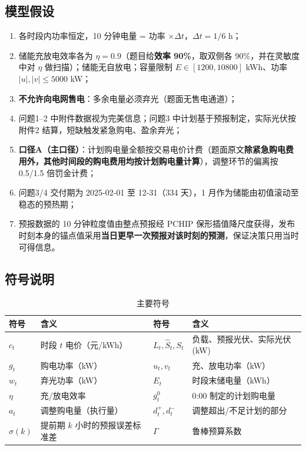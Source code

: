 \documentclass[11pt,a4paper]{ctexart}
\begin{document}
\subsection{模型假设}
\begin{enumerate}[label=\textbf{A\arabic*.}]
  \item 各时段内功率恒定，10 分钟电量 = 功率 $\times\Delta t$，$\Delta t=1/6$ h；
  \item 储能充放电效率各为 $\eta=0.9$（题目给\textbf{效率 90\%}，取双侧各 90\%，并在灵敏度中对 $\eta$ 做扫描）；储能无自放电；容量限制 $E\in[1200,10800]$ kWh、功率 $|u|,|v|\le 5000$ kW；
  \item \textbf{不允许向电网售电}：多余电量必须弃光（题面无售电通道）；
  \item 问题1--2 中附件数据视为完美信息；问题3 中计划基于预报制定，实际光伏按附件2 结算，短缺触发紧急购电、盈余弃光；
  \item \textbf{口径A（主口径）}：计划购电量全额按交易电价计费（题面原文\textbf{除紧急购电费用外，其他时间段的购电费用均按计划购电量计算}），调整环节的偏离按 0.5/1.5 倍罚金计费；
  \item 问题3/4 交付期为 2025-02-01 至 12-31（334 天），1 月作为储能由初值滚动至稳态的预热期；
  \item 预报数据的 10 分钟粒度值由整点预报经 PCHIP 保形插值降尺度获得，发布时刻本身的锚点值采用\textbf{当日更早一次预报对该时刻的预测}，保证决策只用当时可得信息。
\end{enumerate}

\subsection{符号说明}
\begin{table}[H]\centering\small
\caption{主要符号}\label{tab:sym}
\begin{tabular}{ll@{\qquad}ll}
\toprule
符号 & 含义 & 符号 & 含义\\
\midrule
$c_t$ & 时段 $t$ 电价（元/kWh） & $L_t,\hat S_t,S_t$ & 负载、预报光伏、实际光伏 (kW)\\
$g_t$ & 购电功率（kW） & $u_t,v_t$ & 充、放电功率（kW）\\
$w_t$ & 弃光功率（kW） & $E_t$ & 时段末储电量（kWh）\\
$\eta$ & 充/放电效率 & $g^0_t$ & 0:00 制定的计划购电量\\
$a_t$ & 调整购电量（执行量） & $d^{+}_t,d^{-}_t$ & 调整超出/不足计划的部分\\
$\sigma(k)$ & 提前期 $k$ 小时的预报误差标准差 & $\Gamma$ & 鲁棒预算系数\\
\bottomrule
\end{tabular}
\end{table}
\end{document}
